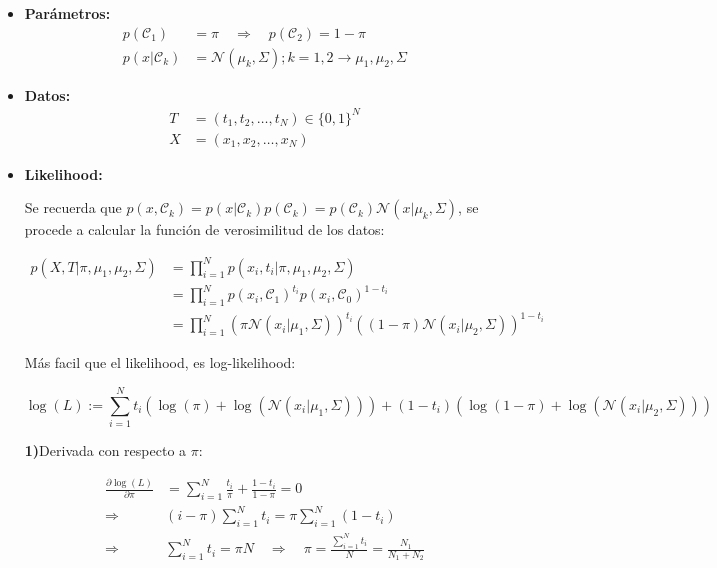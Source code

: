 \begin{itemize}
	\item\textbf{Parámetros:}
	\begin{align}
	p(\mathcal{C}_1)&=\pi \quad \Rightarrow \quad p(\mathcal{C}_2)=1-\pi\\
	p(x|\mathcal{C}_k) &= \mathcal{N}(\mu_k,  \Sigma); k=1,2
	\rightarrow \mu_1,\mu_2,\Sigma
	\end{align}
	
	\item\textbf{Datos:}
	\begin{align}
	T&=(t_1,t_2,\ldots,t_N) \in \{0,1\}^N\\
	X&=(x_1,x_2,\ldots,x_N)
	\end{align}
	
	\item\textbf{Likelihood:}
	
	Se recuerda que $p(x,\mathcal{C}_k)=p(x|\mathcal{C}_k)p(\mathcal{C}_k)=p(\mathcal{C}_k)\mathcal{N}(x|\mu_k,\Sigma)$, se procede a calcular la función de verosimilitud de los datos:
	
	\begin{align}
	p(X,T|\pi,\mu_1,\mu_2,\Sigma) &= \prod_{i=1}^{N}p(x_i,t_i|\pi,\mu_1,\mu_2,\Sigma)\\
	&= \prod_{i=1}^{N}p(x_i,\mathcal{C}_1)^{t_i}p(x_i,\mathcal{C}_0)^{1-t_i}\\
	&= \prod_{i=1}^{N}(\pi\mathcal{N}(x_i|\mu_1,\Sigma))^{t_i}
	((1-\pi)\mathcal{N}(x_i|\mu_2,\Sigma))^{1-t_i}
	\end{align}
	
	Más facil que el likelihood, es log-likelihood:
	
	\begin{equation}
	\log(L) := \sum_{i=1}^{N}t_i(\log(\pi)+\log(\mathcal{N}(x_i|\mu_1,\Sigma)))+(1-t_i)(\log(1-\pi)+\log(\mathcal{N}(x_i|\mu_2,\Sigma)))
	\end{equation}
	
	\newpage
	\noindent \textbf{1)}Derivada con respecto a $\pi$:
	
	\begin{align}
	\frac{\partial\log(L)}{\partial\pi} &= \sum_{i=1}^N \frac{t_i}{\pi}+\frac{1-t_i}{1-\pi}=0\\
	\Rightarrow \quad & (i-\pi)\sum_{i=1}^Nt_i = \pi\sum_{i=1}^N(1-t_i)\\
	\Rightarrow \quad & \sum_{i=1}^Nt_i=\pi N \quad\Rightarrow\quad \pi = \frac{\sum_{i=1}^Nt_i}{N} = \frac{N_1}{N_1+N_2}
	\end{align}
	

\end{itemize}

